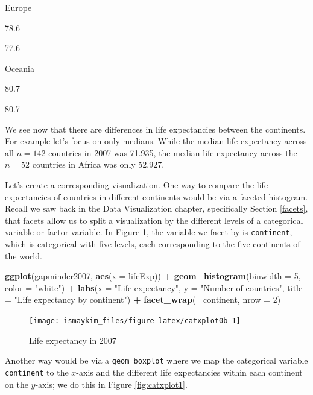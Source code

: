 \documentclass[12pt,]{krantz}
\makeatletter
\newenvironment{Shaded}{\begin{snugshade}}{\end{snugshade}}
\newcommand{\KeywordTok}[1]{\textcolor[rgb]{0.27,0.27,0.27}{\textbf{#1}}}
\newcommand{\DataTypeTok}[1]{\textcolor[rgb]{0.27,0.27,0.27}{#1}}
\newcommand{\DecValTok}[1]{\textcolor[rgb]{0.06,0.06,0.06}{#1}}
\newcommand{\StringTok}[1]{\textcolor[rgb]{0.5,0.5,0.5}{#1}}
\newcommand{\OperatorTok}[1]{\textcolor[rgb]{0.43,0.43,0.43}{\textbf{#1}}}
\newcommand{\NormalTok}[1]{#1}
\newenvironment{kframe}{%
\medskip{}
\setlength{\fboxsep}{.8em}
 \def\at@end@of@kframe{}%
 \ifinner\ifhmode%
  \def\at@end@of@kframe{\end{minipage}}%
  \begin{minipage}{\columnwidth}%
 \fi\fi%
 \def\FrameCommand##1{\hskip\@totalleftmargin \hskip-\fboxsep
 \colorbox{shadecolor}{##1}\hskip-\fboxsep
     \hskip-\linewidth \hskip-\@totalleftmargin \hskip\columnwidth}%
 \MakeFramed {\advance\hsize-\width
   \@totalleftmargin\z@ \linewidth\hsize
   \@setminipage}}%
 {\par\unskip\endMakeFramed%
 \at@end@of@kframe}
\renewenvironment{Shaded}{\begin{kframe}}{\end{kframe}}
\makeatother
\begin{document}
Europe

78.6

77.6

Oceania

80.7

80.7

We see now that there are differences in life expectancies between the
continents. For example let's focus on only medians. While the median
life expectancy across all \(n = 142\) countries in 2007 was 71.935, the
median life expectancy across the \(n =52\) countries in Africa was only
52.927.

Let's create a corresponding visualization. One way to compare the life
expectancies of countries in different continents would be via a faceted
histogram. Recall we saw back in the Data Visualization chapter,
specifically Section \ref{facets}, that facets allow us to split a
visualization by the different levels of a categorical variable or
factor variable. In Figure \ref{fig:catxplot0b}, the variable we facet
by is \texttt{continent}, which is categorical with five levels, each
corresponding to the five continents of the world.

\begin{Shaded}
\begin{Highlighting}[]
\KeywordTok{ggplot}\NormalTok{(gapminder2007, }\KeywordTok{aes}\NormalTok{(}\DataTypeTok{x =}\NormalTok{ lifeExp)) }\OperatorTok{+}
\StringTok{  }\KeywordTok{geom_histogram}\NormalTok{(}\DataTypeTok{binwidth =} \DecValTok{5}\NormalTok{, }\DataTypeTok{color =} \StringTok{"white"}\NormalTok{) }\OperatorTok{+}
\StringTok{  }\KeywordTok{labs}\NormalTok{(}\DataTypeTok{x =} \StringTok{"Life expectancy"}\NormalTok{, }\DataTypeTok{y =} \StringTok{"Number of countries"}\NormalTok{, }
       \DataTypeTok{title =} \StringTok{"Life expectancy by continent"}\NormalTok{) }\OperatorTok{+}
\StringTok{  }\KeywordTok{facet_wrap}\NormalTok{(}\OperatorTok{~}\StringTok{ }\NormalTok{continent, }\DataTypeTok{nrow =} \DecValTok{2}\NormalTok{)}
\end{Highlighting}
\end{Shaded}

\begin{figure}

{\centering \texttt{[image: ismaykim\_files/figure-latex/catxplot0b-1]} 

}

\caption{Life expectancy in 2007}\label{fig:catxplot0b}
\end{figure}

Another way would be via a \texttt{geom\_boxplot} where we map the
categorical variable \texttt{continent} to the \(x\)-axis and the
different life expectancies within each continent on the \(y\)-axis; we
do this in Figure \ref{fig:catxplot1}.
\end{document}
